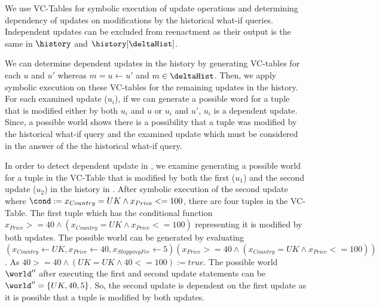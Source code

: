
We use VC-Tables for symbolic execution of update operations and determining dependency of updates on  modifications by the historical what-if queries. Independent updates can be excluded from reenactment as their output is the same in $\history$ and $\history[\deltaHist]$.




We can determine dependent updates in the history by generating VC-tables for each $u$ and $ u'$ whereas $m = u \gets u'$ and $m \in \deltaHist$. Then, we apply symbolic execution on these VC-tables for the remaining updates in the history. For each examined update ($u_i$), if we can generate a possible word for a tuple that is modified either by both $u_i$ and $u$ or $u_i$ and $u'$, $u_i$ is a dependent update. Since, a possible world shows there is a possibility that a tuple was modified by the historical what-if query and the examined update which must be considered in the answer of the the historical what-if query.




\begin{exam}
In order to detect dependent update in , we examine generating a possible world for a tuple in the VC-Table that is modified by both the first ($u_1$) and the second update ($u_2$) in the history in .
 After symbolic execution of the second update where $\cond:= x_{Country}=UK \wedge x_{Price} <=100$, there are four tuples in the VC-Table. The first tuple which has the conditional function
 $x_{Price} >=40 \wedge (x_{Country}=UK \wedge x_{Price} <=100)$ representing it is modified by both updates. The possible world can be generated by evaluating $(x_{Country} \leftarrow UK,x_{Price} \leftarrow 40,x_{ShippingFee} \leftarrow 5)(x_{Price}>=40 \wedge (x_{Country}=UK \wedge x_{Price} <=100))$. As $40>=40 \wedge (UK=UK \wedge 40 <=100):= true$. The possible world $\world''$ after executing the first and second update statements can be $\world''=\lbrace UK,40,5\rbrace$. So, the second update is dependent on the first update as it is possible that  a tuple is modified by both updates.
\end{exam}





